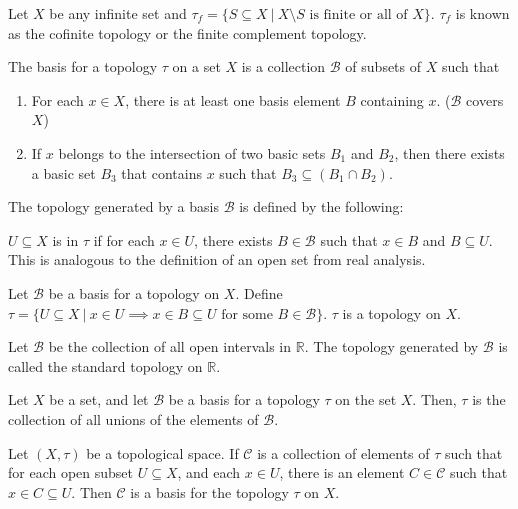 \documentclass{article}
\newcommand{\R}{\mathbb R}
\begin{document}
    Let $X$ be any infinite set and $\tau_f = \{S \subseteq X~|~X \setminus S \text{ is finite or all of } X\}$. $\tau_f$ is known as the cofinite topology or the finite complement topology.

\medskip{}

    The basis for a topology $\tau$ on a set $X$ is a collection $\mathcal B$ of subsets of $X$ such that
    \begin{enumerate}
        \item For each $x \in X$, there is at least one basis element $B$ containing $x$. ($\mathcal B$ covers $X$)
        \item If $x$ belongs to the intersection of two basic sets $B_1$ and $B_2$, then there exists a basic set $B_3$ that contains $x$ such that $B_3 \subseteq (B_1 \cap B_2)$.
    \end{enumerate}

\medskip{}

    The topology generated by a basis $\mathcal B$ is defined by the following:

    $U \subseteq X$ is in $\tau$ if for each $x \in U$, there exists $B \in \mathcal B$ such that $x \in B$ and $B \subseteq U$. This is analogous to the definition of an open set from real analysis.

\medskip{}

    Let $\mathcal B$ be a basis for a topology on $X$. Define $\tau = \{U \subseteq X ~|~ x \in U \implies x \in B \subseteq U \text{ for some } B \in \mathcal B\}.$ $\tau$ is a topology on $X$.

\medskip\noindent{\bf Standard Topology on $\R$}

    Let $\mathcal B$ be the collection of all open intervals in $\R$. The topology generated by $\mathcal B$ is called the standard topology on $\R$.

\medskip{}

    Let $X$ be a set, and let $\mathcal B$ be a basis for a topology $\tau$ on the set $X$. Then, $\tau$ is the collection of all unions of the elements of $\mathcal B$.

\medskip{}

    Let $(X,\tau)$ be a topological space. If $\mathcal C$ is a collection of elements of $\tau$ such that for each open subset $U \subseteq X$, and each $x \in U$, there is an element $C \in \mathcal C$ such that $x \in C \subseteq U$. Then $\mathcal C$ is a basis for the topology $\tau$ on $X$.
\end{document}
